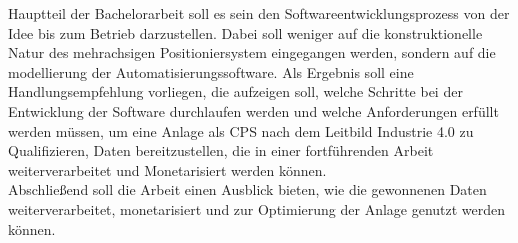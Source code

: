\documentclass[12pt, a4paper, twoside]{article} %
\begin{document}
Hauptteil der Bachelorarbeit soll es sein den Softwareentwicklungsprozess von der Idee bis zum Betrieb darzustellen. Dabei soll weniger auf die konstruktionelle Natur des mehrachsigen Positioniersystem eingegangen werden, sondern auf die modellierung der Automatisierungssoftware. Als Ergebnis soll eine Handlungsempfehlung vorliegen, die aufzeigen soll, welche Schritte bei der Entwicklung der Software durchlaufen werden und welche Anforderungen erfüllt werden müssen, um eine Anlage als CPS nach dem Leitbild Industrie 4.0 zu Qualifizieren, Daten bereitzustellen, die in einer fortführenden Arbeit weiterverarbeitet und Monetarisiert werden können.\\
Abschließend soll die Arbeit einen Ausblick bieten, wie die gewonnenen Daten weiterverarbeitet, monetarisiert und zur Optimierung der Anlage genutzt werden können.

\end{document}

